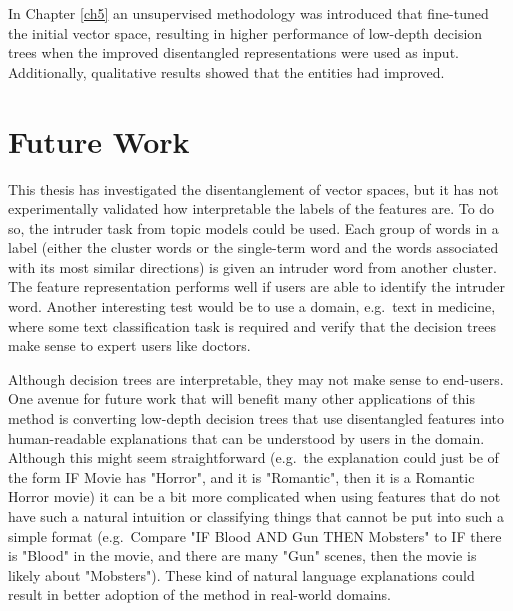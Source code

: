 
In Chapter \ref{ch5} an unsupervised methodology was introduced that fine-tuned the initial vector space, resulting in higher performance of low-depth decision trees  when the improved disentangled representations were used as input. Additionally, qualitative results showed that the entities had improved. 


\section{Future Work}


This thesis has investigated the disentanglement of  vector spaces, but it has not experimentally validated how interpretable the  labels of the features  are. To do so, the intruder task from topic models could be used. Each group of words in a label (either the cluster words or the single-term word and the words associated with its most similar directions) is given an intruder word from another cluster. The feature representation performs well if users are able to identify the intruder word. Another interesting test would be to use a domain, e.g.\ text in medicine, where some text classification task is required and verify that the decision trees make sense to expert users like doctors. 



Although decision trees are interpretable, they may not make sense to end-users. One avenue for future work that will benefit many other applications of this method is converting low-depth decision trees that use disentangled features into human-readable explanations that can be understood by users in the domain. Although this might seem straightforward (e.g.\ the explanation could just be of the form IF Movie has "Horror", and it is "Romantic", then it is a Romantic Horror movie) it can be a bit more complicated when using features that do not have such a natural intuition or classifying things that cannot be put into such a simple format (e.g.\ Compare "IF Blood AND Gun THEN Mobsters" to IF there is "Blood" in the movie, and there are many "Gun" scenes, then the movie is likely about "Mobsters"). These kind of natural language explanations could result in better adoption of the method in real-world domains.

